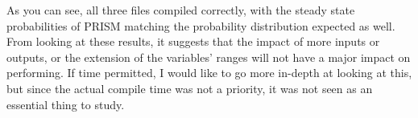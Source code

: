 \documentclass[report.tex]{subfiles}
\begin{document}
As you can see, all three files compiled correctly, with the steady state 
probabilities of PRISM matching the probability distribution expected as well.
From looking at these results, it suggests that the impact of more inputs or
outputs, or the extension of the variables' ranges will not have a major
impact on performing. If time permitted, I would like to go more in-depth at
looking at this, but since the actual compile time was not a priority, it was
not seen as an essential thing to study.
\newpage
\end{document}
